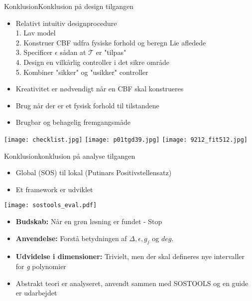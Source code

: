 \begin{frame}{Konklusion}{Konklusion på design tilgangen}
\begin{itemize}
	\item Relativt intuitiv designprocedure \\	\vspace*{0.08cm}
	\scriptsize {\color{white}{m}} 1. Lav model \\	
    \scriptsize {\color{white}{m}} 2. Konstruer CBF udfra fysiske forhold og beregn Lie afledede\\	
    \scriptsize {\color{white}{m}} 3. Specificer $\epsilon$ sådan at $\mathcal{T}$ er "tilpas" \\	
    \scriptsize {\color{white}{m}} 4. Design en vilkårlig controller i det sikre område \\ 	
    \scriptsize {\color{white}{m}} 5. Kombiner "sikker" og "usikker" controller \\
	\item \normalsize Kreativitet er nødvendigt når en CBF skal konstrueres
	\item Brug når der er et fysisk forhold til tilstandene
	\item Brugbar og behagelig fremgangsmåde
\end{itemize}
\vspace*{0.2cm}
\texttt{[image: checklist.jpg]} \hspace*{0.2cm}
\texttt{[image: p01tgd39.jpg]} \hspace*{0.2cm}
\texttt{[image: 9212\_fit512.jpg]}
\end{frame}



\begin{frame}{Konklusion}{konklusion på analyse tilgangen}
\begin{itemize}
	\item Global (SOS) til lokal (Putinars Positivstellensatz)
	\item Et framework er udviklet
\end{itemize}

\texttt{[image: sostools\_eval.pdf]}

\begin{itemize}
	\item \textbf{Budskab:} Når en grøn løsning er fundet - Stop
	\item \textbf{Anvendelse:} Forstå betydningen af $\Delta, \epsilon, g_j$ og $deg$.
	\item \textbf{Udvidelse i dimensioner:} Trivielt, men der skal defineres nye intervaller for \textit{g} polynomier 
	\item Abstrakt teori er analyseret, anvendt sammen med SOSTOOLS og en guide er udarbejdet
\end{itemize}

\end{frame}

